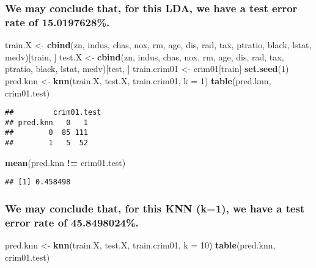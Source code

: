 \documentclass[]{article}
\newenvironment{Shaded}{\begin{snugshade}}{\end{snugshade}}
\newcommand{\KeywordTok}[1]{\textcolor[rgb]{0.13,0.29,0.53}{\textbf{#1}}}
\newcommand{\DataTypeTok}[1]{\textcolor[rgb]{0.13,0.29,0.53}{#1}}
\newcommand{\DecValTok}[1]{\textcolor[rgb]{0.00,0.00,0.81}{#1}}
\newcommand{\StringTok}[1]{\textcolor[rgb]{0.31,0.60,0.02}{#1}}
\newcommand{\OperatorTok}[1]{\textcolor[rgb]{0.81,0.36,0.00}{\textbf{#1}}}
\newcommand{\NormalTok}[1]{#1}
\begin{document}
\subsubsection{We may conclude that, for this LDA, we have a test error
rate of
15.0197628\%.}\label{we-may-conclude-that-for-this-lda-we-have-a-test-error-rate-of-15.0197628.}

\begin{Shaded}
\begin{Highlighting}[]
\NormalTok{train.X <-}\StringTok{ }\KeywordTok{cbind}\NormalTok{(zn, indus, chas, nox, rm, age, dis, rad, tax, ptratio, black, lstat, medv)[train, ]}
\NormalTok{test.X <-}\StringTok{ }\KeywordTok{cbind}\NormalTok{(zn, indus, chas, nox, rm, age, dis, rad, tax, ptratio, black, lstat, medv)[test, ]}
\NormalTok{train.crim01 <-}\StringTok{ }\NormalTok{crim01[train]}
\KeywordTok{set.seed}\NormalTok{(}\DecValTok{1}\NormalTok{)}
\NormalTok{pred.knn <-}\StringTok{ }\KeywordTok{knn}\NormalTok{(train.X, test.X, train.crim01, }\DataTypeTok{k =} \DecValTok{1}\NormalTok{)}
\KeywordTok{table}\NormalTok{(pred.knn, crim01.test)}
\end{Highlighting}
\end{Shaded}

\begin{verbatim}
##         crim01.test
## pred.knn   0   1
##        0  85 111
##        1   5  52
\end{verbatim}

\begin{Shaded}
\begin{Highlighting}[]
\KeywordTok{mean}\NormalTok{(pred.knn }\OperatorTok{!=}\StringTok{ }\NormalTok{crim01.test)}
\end{Highlighting}
\end{Shaded}

\begin{verbatim}
## [1] 0.458498
\end{verbatim}

\subsubsection{We may conclude that, for this KNN (k=1), we have a test
error rate of
45.8498024\%.}\label{we-may-conclude-that-for-this-knn-k1-we-have-a-test-error-rate-of-45.8498024.}

\begin{Shaded}
\begin{Highlighting}[]
\NormalTok{pred.knn <-}\StringTok{ }\KeywordTok{knn}\NormalTok{(train.X, test.X, train.crim01, }\DataTypeTok{k =} \DecValTok{10}\NormalTok{)}
\KeywordTok{table}\NormalTok{(pred.knn, crim01.test)}
\end{Highlighting}
\end{Shaded}
\end{document}
